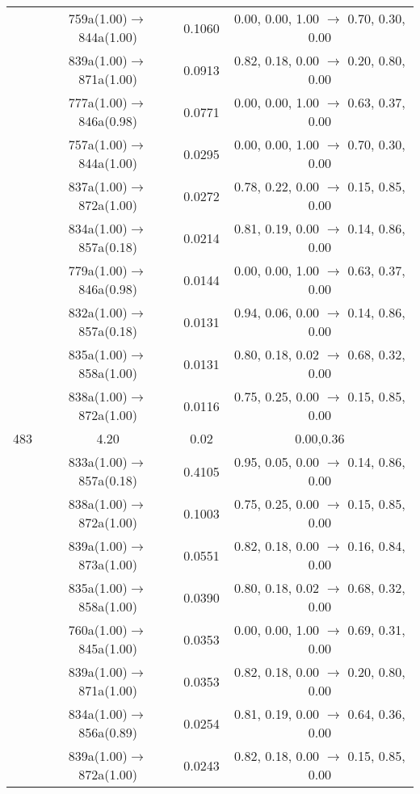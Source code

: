 \documentclass[10pt,a4paper]{article}
\begin{document}
\begin{longtable}{c|c|c|c}
 	& 759a(1.00)$\rightarrow$844a(1.00) &	 0.1060 &	 0.00, 0.00, 1.00 $\rightarrow$ 0.70, 0.30, 0.00 \\ 
 	& 839a(1.00)$\rightarrow$871a(1.00) &	 0.0913 &	 0.82, 0.18, 0.00 $\rightarrow$ 0.20, 0.80, 0.00 \\ 
 	& 777a(1.00)$\rightarrow$846a(0.98) &	 0.0771 &	 0.00, 0.00, 1.00 $\rightarrow$ 0.63, 0.37, 0.00 \\ 
 	& 757a(1.00)$\rightarrow$844a(1.00) &	 0.0295 &	 0.00, 0.00, 1.00 $\rightarrow$ 0.70, 0.30, 0.00 \\ 
 	& 837a(1.00)$\rightarrow$872a(1.00) &	 0.0272 &	 0.78, 0.22, 0.00 $\rightarrow$ 0.15, 0.85, 0.00 \\ 
 	& 834a(1.00)$\rightarrow$857a(0.18) &	 0.0214 &	 0.81, 0.19, 0.00 $\rightarrow$ 0.14, 0.86, 0.00 \\ 
 	& 779a(1.00)$\rightarrow$846a(0.98) &	 0.0144 &	 0.00, 0.00, 1.00 $\rightarrow$ 0.63, 0.37, 0.00 \\ 
 	& 832a(1.00)$\rightarrow$857a(0.18) &	 0.0131 &	 0.94, 0.06, 0.00 $\rightarrow$ 0.14, 0.86, 0.00 \\ 
 	& 835a(1.00)$\rightarrow$858a(1.00) &	 0.0131 &	 0.80, 0.18, 0.02 $\rightarrow$ 0.68, 0.32, 0.00 \\ 
 	& 838a(1.00)$\rightarrow$872a(1.00) &	 0.0116 &	 0.75, 0.25, 0.00 $\rightarrow$ 0.15, 0.85, 0.00 \\ 
 \hline483 &	 4.20 &	 0.02 &	 0.00,0.36 \\ 
  	& 833a(1.00)$\rightarrow$857a(0.18) &	 0.4105 &	 0.95, 0.05, 0.00 $\rightarrow$ 0.14, 0.86, 0.00 \\ 
 	& 838a(1.00)$\rightarrow$872a(1.00) &	 0.1003 &	 0.75, 0.25, 0.00 $\rightarrow$ 0.15, 0.85, 0.00 \\ 
 	& 839a(1.00)$\rightarrow$873a(1.00) &	 0.0551 &	 0.82, 0.18, 0.00 $\rightarrow$ 0.16, 0.84, 0.00 \\ 
 	& 835a(1.00)$\rightarrow$858a(1.00) &	 0.0390 &	 0.80, 0.18, 0.02 $\rightarrow$ 0.68, 0.32, 0.00 \\ 
 	& 760a(1.00)$\rightarrow$845a(1.00) &	 0.0353 &	 0.00, 0.00, 1.00 $\rightarrow$ 0.69, 0.31, 0.00 \\ 
 	& 839a(1.00)$\rightarrow$871a(1.00) &	 0.0353 &	 0.82, 0.18, 0.00 $\rightarrow$ 0.20, 0.80, 0.00 \\ 
 	& 834a(1.00)$\rightarrow$856a(0.89) &	 0.0254 &	 0.81, 0.19, 0.00 $\rightarrow$ 0.64, 0.36, 0.00 \\ 
 	& 839a(1.00)$\rightarrow$872a(1.00) &	 0.0243 &	 0.82, 0.18, 0.00 $\rightarrow$ 0.15, 0.85, 0.00 \\ 

\end{longtable}
\end{document}
